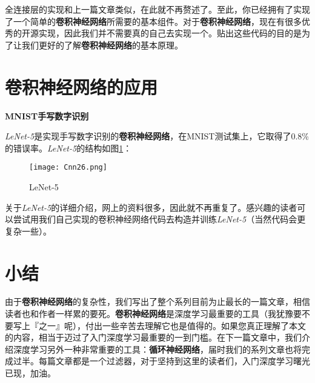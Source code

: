 全连接层的实现和上一篇文章类似，在此就不再赘述了。至此，你已经拥有了实现了一个简单的\textbf{卷积神经网络}所需要的基本组件。对于\textbf{卷积神经网络}，现在有很多优秀的开源实现，因此我们并不需要真的自己去实现一个。贴出这些代码的目的是为了让我们更好的了解\textbf{卷积神经网络}的基本原理。



\section{卷积神经网络的应用}\label{Cnn:13}

\textbf{MNIST手写数字识别}

\emph{LeNet-5}是实现手写数字识别的\textbf{卷积神经网络}，在MNIST测试集上，它取得了0.8\%的错误率。\emph{LeNet-5}的结构如图\ref{fig:Cnn26}：

\begin{figure}[!h]
	\centering
	\texttt{[image: Cnn26.png]}
	\caption{LeNet-5}
	\label{fig:Cnn26}
\end{figure}

关于\emph{LeNet-5}的详细介绍，网上的资料很多，因此就不再重复了。感兴趣的读者可以尝试用我们自己实现的卷积神经网络代码去构造并训练\emph{LeNet-5}（当然代码会更复杂一些）。

\section{小结}

由于\textbf{卷积神经网络}的复杂性，我们写出了整个系列目前为止最长的一篇文章，相信读者也和作者一样累的要死。\textbf{卷积神经网络}是深度学习最重要的工具（我犹豫要不要写上『之一』呢），付出一些辛苦去理解它也是值得的。如果您真正理解了本文的内容，相当于迈过了入门深度学习最重要的一到门槛。在下一篇文章中，我们介绍深度学习另外一种非常重要的工具：\textbf{循环神经网络}，届时我们的系列文章也将完成过半。每篇文章都是一个过滤器，对于坚持到这里的读者们，入门深度学习曙光已现，加油。






